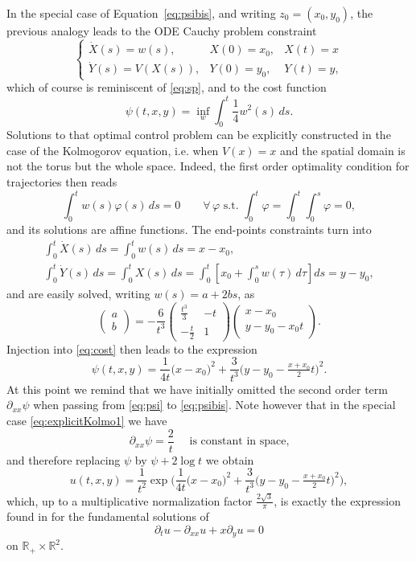 \documentclass[12pt]{article}
\newcommand{\R}{\mathbb{R}}
\begin{document}
In the special case of Equation~\eqref{eq:psibis}, and writing $z_0 = (x_0,
y_0)$, the previous analogy leads to the
ODE Cauchy problem constraint  
\begin{equation}\label{eq:ODE}
	\left\{\begin{array}{lll}
		\dot{X}(s) = w(s), & X(0) = x_0, &X(t) = x\\
		\dot{Y}(s) = V(X(s)), & Y(0) = y_0, & Y(t) = y,
	\end{array}\right.  
\end{equation}
which of course is reminiscent of \eqref{eq:sp}, and to the cost function 
\begin{equation}\label{eq:cost}
\psi(t,x,y) = \inf_w \int_0^t \frac{1}{4} w^2(s) \, ds.
\end{equation}
Solutions to that optimal control problem can be explicitly constructed in the case 
of the Kolmogorov equation, i.e. when $V(x) = x$ and
the spatial domain is not the torus but the whole space. Indeed, the first order
optimality condition for trajectories then reads
$$
\int_0^t w(s)\varphi(s)\, ds = 0 \qquad\forall\, \varphi \text{ s.t. }
\int_0^t\varphi = \int_0^t\int_0^s \varphi = 0,
$$
and its solutions are affine functions. The end-points constraints turn into 
$$
\begin{array}{l}
	\int_0^t \dot{X}(s) \, ds = \int_0^t w(s)\, ds = x - x_0,\\[2pt]
	\int_0^t \dot{Y}(s) \, ds = \int_0^t X(s)\, ds = \int_0^t [x_0 +
	\int_0^s w(\tau)\, d\tau] ds = y - y_0,
\end{array}
$$
and are easily solved, writing $w(s) = a + 2bs$, as
$$
\begin{pmatrix} a\\b\end{pmatrix} = -\frac{6}{t^3} 
\begin{pmatrix} \frac{t^3}{3} & -t\\ - \frac{t}{2} & 1 \end{pmatrix} 
\begin{pmatrix} x-x_0\\ y - y_0 - x_0t \end{pmatrix}.
$$
Injection into \eqref{eq:cost} then leads to the expression
\begin{equation}\label{eq:explicitKolmo1}
	\psi(t,x,y) = \frac{1}{4t}\big(x-x_0\big)^2 + \frac{3}{t^3}\big( y - y_0 - \tfrac{x +
x_0}{2}t\big)^2.
\end{equation}
At this point we remind that we have initially omitted the second order term
$\partial_{xx} \psi$ when passing from \eqref{eq:psi} to \eqref{eq:psibis}. Note
however that in the special case \eqref{eq:explicitKolmo1} we have
$$
\partial_{xx}\psi = \frac{2}{t} \quad\text{ is constant in space,} 
$$
and therefore replacing $\psi$ by $\psi + 2\log t$ we obtain 
\begin{equation}\label{eq:fundaKolmo}
	u(t,x,y) = \frac{1}{t^2} \exp\Big(\frac{1}{4t}\big(x-x_0\big)^2 + \frac{3}{t^3}\big( y - y_0 - \tfrac{x +
x_0}{2}t\big)^2\Big),
\end{equation}
which, up to a multiplicative normalization factor $\frac{2\sqrt{3}}{\pi}$, is
exactly the expression found in \cite{Kol34} for the fundamental solutions
of
$$
\partial_t u - \partial_{xx}u + x\partial_y u = 0
$$
on $\R_+\times \R^2.$
\end{document}
